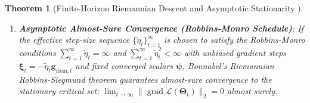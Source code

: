 \documentclass[journal]{IEEEtran}
\newtheorem{theorem}{Theorem}
\begin{document}
\begin{theorem}[Finite-Horizon Riemannian Descent and Asymptotic Stationarity \cite{bonnabel2013stochastic,absil2008optimization}]
\begin{enumerate}
\begin{equation}
    \label{eq:finite_horizon_bound}
    \end{equation}
    where $\underline{c} = 0.2 c_{\min}$ and $\overline{c} = 2.0 c_{\max}$. Thus, iterates descend rapidly within $T=140$ steps to a bounded neighborhood of the stationary set proportional to $\eta_{\max}$ and mini-batch noise $\sigma_g$.
    \item \textbf{Asymptotic Almost-Sure Convergence (Robbins-Monro Schedule)}: If the effective step-size sequence $\{\tilde{\eta}_t\}_{t=1}^\infty$ is chosen to satisfy the Robbins-Monro conditions $\sum_{t=1}^\infty \tilde{\eta}_t = \infty$ and $\sum_{t=1}^\infty \tilde{\eta}_t^2 < \infty$ with unbiased gradient steps $\boldsymbol{\xi}_t = -\tilde{\eta}_t \mathbf{g}_{\text{riem},t}$ and fixed converged scalars $\boldsymbol{\psi}$, Bonnabel's Riemannian Robbins-Siegmund theorem \cite{bonnabel2013stochastic} guarantees almost-sure convergence to the stationary critical set: $\lim_{t\to\infty} \|\operatorname{grad}\mathcal{L}(\boldsymbol{\Theta}_t)\|_2 = 0$ almost surely.
\end{enumerate}
\end{theorem}
\end{document}
